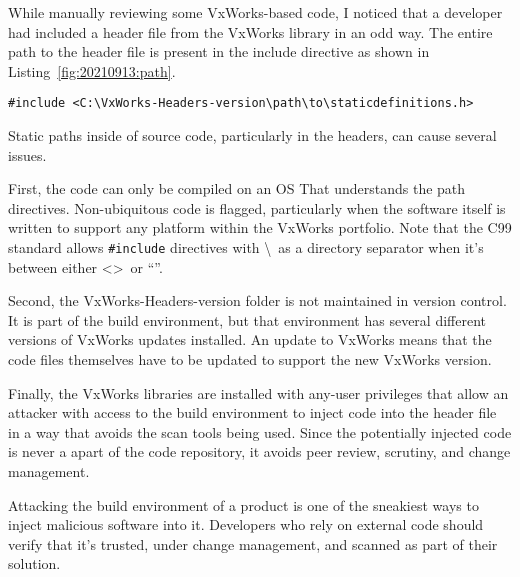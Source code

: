 While manually reviewing some VxWorks-based code, I noticed that a developer had included a header file from the VxWorks library in an odd way. The entire path to the header file is present in the include directive as shown in Listing~\ref{fig:20210913:path}.

\begin{lstlisting}[caption={Include Directive},captionpos=b,style=CStyle,basicstyle=\scriptsize,label={lst:20210913:path}]
#include <C:\VxWorks-Headers-version\path\to\staticdefinitions.h>
\end{lstlisting}

Static paths inside of source code, particularly in the headers, can cause several issues.

First, the code can only be compiled on an OS That understands the path directives. Non-ubiquitous code is flagged, particularly when the software itself is written to support any platform within the VxWorks portfolio.\autocite{20210913:cwe-589} Note that the C99 standard allows \texttt{\#include} directives with \textbackslash\ as a directory separator when it's between either \textless \textgreater\ or ``''.

Second, the VxWorks-Headers-version folder is not maintained in version control. It is part of the build environment, but that environment has several different versions of VxWorks updates installed. An update to VxWorks means that the code files themselves have to be updated to support the new VxWorks version.

Finally, the VxWorks libraries are installed with any-user privileges that allow an attacker with access to the build environment to inject code into the header file in a way that avoids the scan tools being used. Since the potentially injected code is never a apart of the code repository, it avoids peer review, scrutiny, and change management.

Attacking the build environment of a product is one of the sneakiest ways to inject malicious software into it. Developers who rely on external code should verify that it's trusted, under change management, and scanned as part of their solution.
